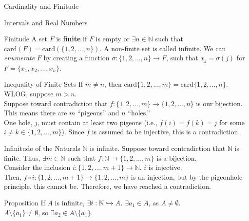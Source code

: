 \documentclass[10pt]{extarticle}
\begin{document}
\begin{problem}{Cardinality and Finitude}
\begin{problem}{Intervals and Real Numbers}
\begin{itemize}
      \end{itemize}
    \end{problem}
    \begin{problem}{Finitude}
      A set $F$ is \textbf{finite} if $F$ is empty or $\exists n\in \mathbb{N}$ such that $\text{card}(F) = \text{card}\left(\{1,2,\dots,n\}\right)$. A non-finite set is called infinite.
      \tcblower
      We can \textsl{enumerate} $F$ by creating a function $\sigma: \{1,2,\dots,n\}\rightarrow F$, such that $x_j = \sigma(j)$ for $F = \{x_1,x_2,\dots,x_n\}$.
    \end{problem}
    \begin{problem}{Inequality of Finite Sets}
      If $m\neq n$, then $\text{card}\{1,2,\dots,m\} = \text{card}\{1,2,\dots,n\}$.
      \tcblower
      WLOG, suppose $m>n$.\\

      Suppose toward contradiction that $f: \{1,2,\dots,m\} \rightarrow \{1,2,\dots,n\}$ is our bijection. This means there are $m$ ``pigeons'' and $n$ ``holes.''\\

      One hole, $j$, must contain at least two pigeons (i.e., $f(i) = f(k) = j$ for some $i\neq k\in \{1,2,\dots,m\}$). Since $f$ is assumed to be injective, this is a contradiction.
    \end{problem}
    \begin{problem}{Infinitude of the Naturals}
      $\mathbb{N}$ is infinite.
      \tcblower
      Suppose toward contradiction that $\mathbb{N}$ is finite. Thus, $\exists m\in \mathbb{N}$ such that $f:\mathbb{N} \rightarrow \{1,2,\dots,m\}$ is a bijection.\\

      Consider the inclusion $i: \{1,2,\dots,m+1\}\rightarrow \mathbb{N}$. $i$ is injective.\\

      Then, $f\circ i: \{1,2,\dots,m+1\} \rightarrow \{1,2,\dots,m\}$ is an injection, but by the pigeonhole principle, this cannot be. Therefore, we have reached a contradiction.
    \end{problem}
    \begin{problem}{Proposition}
      If $A$ is infinite, $\exists i: \mathbb{N} \xhookrightarrow{} A$.
      \tcblower
      $\exists a_1\in A$, as $A\neq \emptyset$.\\

      $A\setminus \{a_1\} \neq \emptyset$, so $\exists a_2 \in A\setminus \{a_1\}$.\\


\end{problem}
\end{problem}
\end{document}
